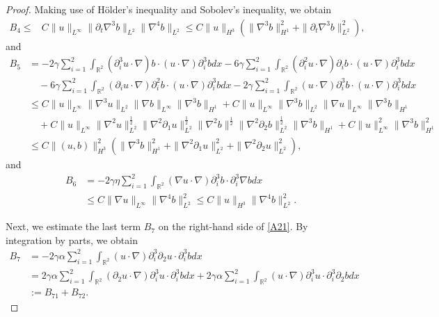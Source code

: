 \documentclass[reqno,11pt]{amsart}
\def\R{\mathbb R}
\numberwithin{Thm}{section}
\begin{document}
\begin{proof}
Making use of H\"{o}lder's inequality and Sobolev's inequality, we obtain
\begin{align}\label{A9}
B_{4}
\leq&
C\|u\|_{L^{\infty}}\|\partial_t\nabla^3b\|_{L^2}\|\nabla^4b\|_{L^2}
\leq C\|u\|_{H^3}\left(\|\nabla^3 b\|_{H^1}^2+\|\partial_t\nabla^3 b\|_{L^2}^2\right),
\end{align}
 and
 \begin{align}\label{A11}
B_{5}&=-2\gamma\sum_{i=1}^2\int_{\R^2}(\partial_i^3u\cdot\nabla) b\cdot (u\cdot\nabla)\partial_i^3 bdx-6\gamma\sum_{i=1}^2\int_{\R^2}(\partial_i^2u\cdot\nabla)\partial_i b\cdot (u\cdot\nabla)\partial_i^3 bdx\nonumber\\
&\quad-6\gamma\sum_{i=1}^2\int_{\R^2}(\partial_i u\cdot\nabla)\partial_i^2 b\cdot (u\cdot\nabla)\partial_i^3 bdx-2\gamma\sum_{i=1}^2\int_{\R^2}(u\cdot\nabla)\partial_i^3 b\cdot (u\cdot\nabla)\partial_i^3 bdx\nonumber\\
&\leq C\|u\|_{L^\infty}\|\nabla^3u\|_{L^2}\|\nabla b\|_{L^\infty}\|\nabla^3 b\|_{H^1}+C\|u\|_{L^\infty}\|\nabla^3b\|_{L^2}\|\nabla u\|_{L^\infty}\|\nabla^3 b\|_{H^1}\nonumber\\
&\quad+C\|u\|_{L^\infty}\|\nabla^2u\|_{L^2}^{\frac{1}{2}}\|\nabla^2\partial_1u\|_{L^2}^{\frac{1}{2}}\|\nabla^2 b\|^{\frac{1}{2}}\|\nabla^2\partial_2b\|_{L^2}^{\frac{1}{2}}\|\nabla^3 b\|_{H^1}+C\|u\|_{L^\infty}^2\|\nabla^3 b\|_{H^1}^2\nonumber\\
&\leq C\|(u,b)\|_{H^3}^2(\|\nabla^3 b\|_{H^1}^2+\|\nabla^2\partial_1 u\|_{L^2}^2+\|\nabla^2\partial_2 u\|_{L^2}^2),
\end{align}
and
\begin{align}\label{A10}
B_{6}
&=-2\gamma\eta\sum_{i=1}^2\int_{\R^2}(\nabla u\cdot\nabla)\partial_i^3b\cdot\partial_i^3\nabla bdx\nonumber\\
&\leq
C\|\nabla u\|_{L^{\infty}}\|\nabla^4 b\|_{L^2}^2
\leq C\|u\|_{H^3}\|\nabla^4 b\|_{L^2}^2.
\end{align}






Next, we estimate the last term $B_7$ on the right-hand side of \eqref{A21}. By integration by parts, we obtain
\begin{align}\label{A112}
B_{7}
&=-2\gamma\alpha\sum_{i=1}^2\int_{\R^2}(u\cdot\nabla)\partial_i^3\partial_2u\cdot \partial_i^3 bdx\nonumber\\
&=2\gamma\alpha\sum_{i=1}^2\int_{\R^2}(\partial_2u\cdot\nabla)\partial_i^3u\cdot\partial_i^3 bdx+2\gamma\alpha\sum_{i=1}^2\int_{\R^2}(u\cdot\nabla)\partial_i^3u\cdot \partial_i^3\partial_2 bdx\nonumber\\
&:=B_{71}+B_{72}.
\end{align}


\end{proof}
\end{document}
